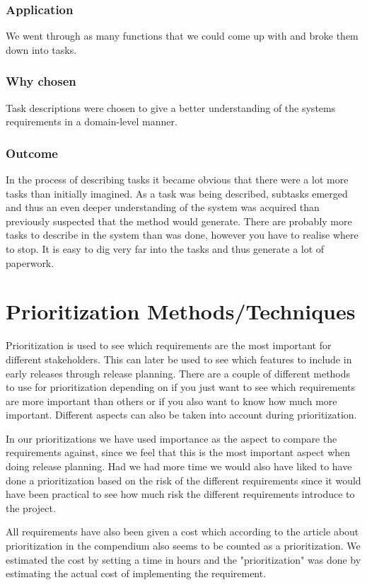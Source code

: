 \documentclass[a4paper]{article}
\begin{document}
			\subsubsection{Application}
				We went through as many functions that we could come up with and broke them down into tasks. 
			\subsubsection{Why chosen}
				Task descriptions were chosen to give a better understanding of the systems requirements in a domain-level manner.
			\subsubsection{Outcome}	
				In the process of describing tasks it became obvious that there were a lot more tasks than initially imagined. As a task was being described, subtasks emerged and thus an even deeper understanding of the system was acquired than previously suspected that the method would generate. There are probably more tasks to describe in the system than was done, however you have to realise where to stop. It is easy to dig very far into the tasks and thus generate a lot of paperwork.

	\section{Prioritization Methods/Techniques}
	Prioritization is used to see which requirements are the most important for different stakeholders. This can later be used to see which features to include in early releases through release planning. There are a couple of different methods to use for prioritization depending on if you just want to see which requirements are more important than others or if you also want to know how much more important. Different aspects can also be taken into account during prioritization. 
	
	In our prioritizations we have used importance as the aspect to compare the requirements against, since we feel that this is the most important aspect when doing release planning. Had we had more time we would also have liked to have done a prioritization based on the risk of the different requirements since it would have been practical to see how much risk the different requirements introduce to the project.
	
	All requirements have also been given a cost which according to the article about prioritization in the compendium also seems to be counted as a prioritization. We estimated the cost by setting a time in hours and the "prioritization" was done by estimating the actual cost of implementing the requirement.
\end{document}
